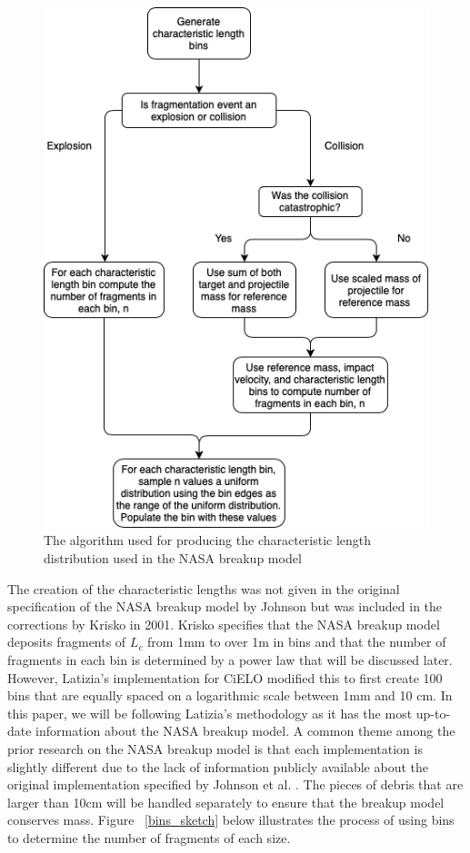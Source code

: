 \documentclass[a4paper, 12pt]{article}
\begin{document}
\begin{figure}[H]
	\centering
	\includegraphics[scale=0.5, trim=0cm 0cm 0cm 5cm]{L_c_flow}
	\caption{The algorithm used for producing the characteristic length distribution used in the NASA breakup model}
\end{figure}

The creation of the characteristic lengths was not given in the original specification of the NASA breakup model by Johnson \citep{johnson_nasas_2001} but was included in the corrections by Krisko in 2001. Krisko specifies that the NASA breakup model deposits fragments of $L_c$ from 1mm to over 1m in bins and that the number of fragments in each bin is determined by a power law that will be discussed later. However, Latizia's implementation for CiELO modified this to first create 100 bins that are equally spaced on a logarithmic scale between 1mm and 10 cm. In this paper, we will be following Latizia's methodology as it has the most up-to-date information about the NASA breakup model. A common theme among the prior research on the NASA breakup model is that each implementation is slightly different due to the lack of information publicly available about the original implementation specified by Johnson et al. \cite{johnson_nasas_2001}. The pieces of debris that are larger than 10cm will be handled separately to ensure that the breakup model conserves mass. Figure ~\ref{bins_sketch} below illustrates the process of using bins to determine the number of fragments of each size.
\end{document}
